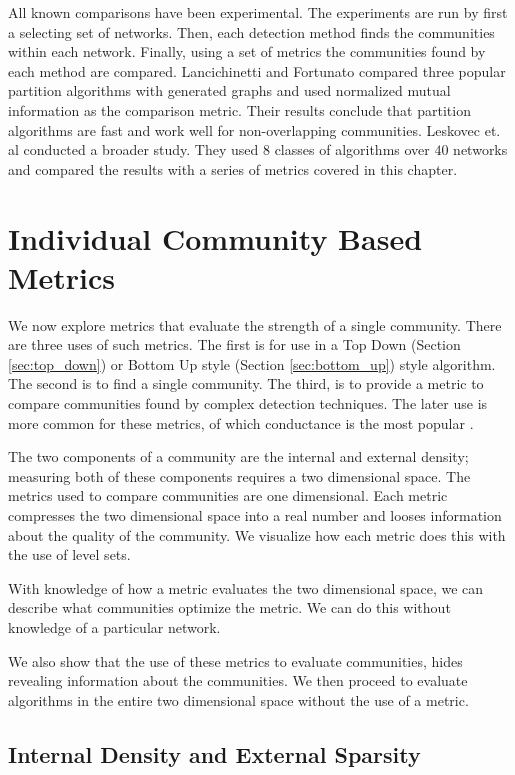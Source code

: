 \documentclass[phd,tocprelim]{cornell}
\begin{document}
All known comparisons have been experimental.  The experiments are run by first a selecting set of networks.  Then, each detection method finds the communities within each network.  Finally, using a set of metrics the communities found by each method are compared.  Lancichinetti and Fortunato \cite{lanc:2009} compared three popular partition algorithms with generated graphs and used normalized mutual information as the comparison metric.  Their results conclude that partition algorithms are fast and work well for non-overlapping communities.  Leskovec et. al \cite{leskovec} conducted a broader study.  They used $8$ classes of algorithms over $40$ networks and compared the results with a series of metrics covered in this chapter.

\section{Individual Community Based Metrics}

We now explore metrics that evaluate the strength of a single community.  There are three uses of such metrics.  The first is for use in a Top Down (Section \ref{sec:top_down}) or Bottom Up style (Section \ref{sec:bottom_up}) style algorithm.    The second is to find a single community.  The third, is to provide a metric to compare communities found by complex detection techniques.  The later use is more common for these metrics, of which conductance is the most popular \cite{JTODO}.

The two components of a community are the internal and external density; measuring both of these components requires a two dimensional space.  The metrics used to compare communities are one dimensional.  Each metric compresses the two dimensional space into a real number and looses information about the quality of the community.  We visualize how each metric does this with the use of level sets. 

With knowledge of how a metric evaluates the two dimensional space, we can describe what communities optimize the metric.  We can do this without knowledge of a particular network.

We also show that the use of these metrics to evaluate communities, hides revealing information about the communities.  We then proceed to evaluate algorithms in the entire two dimensional space without the use of a metric.

\subsection{Internal Density and External Sparsity}
\end{document}
